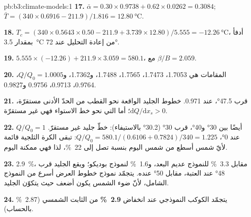\begin{solution}{pb:b3:climate-models:1}
\textbf{17.} $\bar\alpha = 0.30\times0.9738 + 0.62\times0.0262 =
\num{0.3084}$; $\bar T = (340\times0.6916 - 211.9)/1.816 =
\qty{12.80}{\celsius}$.

\textbf{18.} $T_c = (340\times0.5643\times0.50 - 211.9 + 3.739\times12.80)/
5.555 = \qty{-12.26}{\celsius}$، أدفأ بمقدار \qty{3.5}{\celsius} من
إعادة التحليل عند \ang{72}.

\textbf{19.} $5.555\times(-12.26) + 211.9\times3.059 = \num{580.1}$، مع
$\beta/B = \num{2.059}$.

\textbf{20.} المقامات هي 1.7053، 1.7473، 1.7565، 1.7488،
و1.7362، و$Q/Q_0 = \num{1.0005}$، \num{0.9764}، \num{0.9713}،
\num{0.9756} و\num{0.9827}.

\textbf{21.} قرب \ang{47.5}، عند \num{0.971}. خطوط الجليد الواقعة نحو القطب من
الحدّ الأدنى مستقرّة، $\mathrm dQ/\mathrm dx_s > 0$؛ أما التي نحو خط الاستواء فهي
غير مستقرّة.

\textbf{22.} $Q/Q_0 = 1$ أيضًا بين \ang{30} و\ang{40}، قرب
\ang{30} (\ang{30.2} بالاستيفاء): خطّ جليد غير مستقرّ. عند \ang{0}،
$Q/Q_0 = 580.1/(0.6106 + 0.7824)/340 = \num{1.225}$: تبقى الكرة الثلجية قائمة
لأيّ شمس أسطع من شمس اليوم بنسبة تصل إلى \qty{22}{\percent}، لذا فهي
ممكنة اليوم.

\textbf{23.} \qty{2.9}{\percent}، مقابل \qty{3.3}{\percent} للنموذج
عديم البعد، و\qty{1.6}{\percent} لنموذج بوديكو؛ ويقع الجليد
قرب \ang{48} عند العتبة، مقابل \ang{50} عنده. يتجمّد نموذج خطوط العرض
أسرع من النموذج الشامل، لأنّ ضوء الشمس يكون أضعف حيث
يتكوّن الجليد.

\textbf{24.} يتجمّد الكوكب النموذجي عند انخفاض
\textbf{\qty[text-series-to-math=true]{2.9}{\percent}} من الثابت
الشمسي (\qty{2.87}{\percent} بالحساب).
\end{solution}
